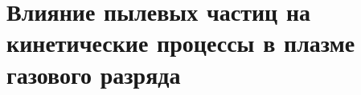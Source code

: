 \chapter{Влияние пылевых частиц на кинетические процессы в плазме газового разряда}
\label{cha:ch_2}
